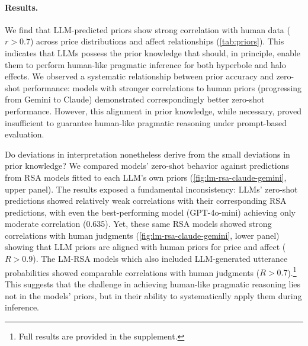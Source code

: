 \paragraph{Results.}

 We find that LLM-predicted priors show strong correlation with human data ($r>0.7$) across price distributions and affect relationships (\autoref{tab:priors}). This indicates that LLMs possess the prior knowledge that should, in principle, enable them to perform human-like pragmatic inference for both hyperbole and halo effects. We observed a systematic relationship between prior accuracy and zero-shot performance: models with stronger correlations to human priors (progressing from Gemini to Claude) demonstrated correspondingly better zero-shot performance. However, this alignment in prior knowledge, while necessary, proved insufficient to guarantee human-like pragmatic reasoning under prompt-based evaluation.


 Do deviations in interpretation nonetheless derive from the small deviations in prior knowledge?
 We compared models' zero-shot behavior against predictions from RSA models fitted to each LLM's own priors (\autoref{fig:lm-rsa-claude-gemini}, upper panel). The results exposed a fundamental inconsistency: LLMs' zero-shot predictions showed relatively weak correlations with their corresponding RSA predictions, with even the best-performing model (GPT-4o-mini) achieving only moderate correlation (0.635). Yet, these same RSA models showed strong correlations with human judgments (\autoref{fig:lm-rsa-claude-gemini}, lower panel) showing that LLM priors are aligned with human priors for price and affect  ($R>0.9$). The LM-RSA models which also included LLM-generated utterance probabilities showed comparable correlations with human judgments  ($R>0.7$).\footnote{Full results are provided in the supplement.}
 This suggests that the challenge in achieving human-like pragmatic reasoning lies not in the models' priors, but in their ability to systematically apply them during inference.
